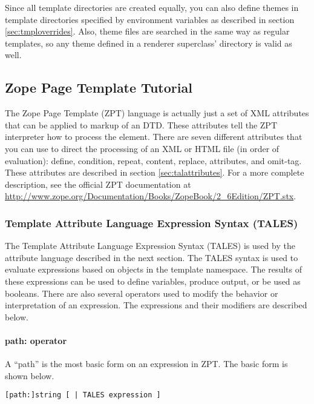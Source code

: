 Since all template directories are created equally, you can also define
themes in template directories specified by environment variables as
described in section \ref{sec:tmploverrides}.  Also, theme files are
searched in the same way as regular templates, so any theme defined
in a renderer superclass' directory is valid as well.


\subsection{Zope Page Template Tutorial\label{sec:zpttutorial}}

The Zope Page Template (ZPT) language is actually just a set of XML
attributes that can be applied to markup of an DTD.  These attributes
tell the ZPT interpreter how to process the element.  There are
seven different attributes that you can use to direct the processing
of an XML or HTML file (in order of evaluation): define, condition, repeat,
content, replace, attributes, and omit-tag.  These attributes are
described in section \ref{sec:talattributes}.  For a more complete description,
see the official ZPT documentation at
\url{http://www.zope.org/Documentation/Books/ZopeBook/2_6Edition/ZPT.stx}.


\subsubsection{Template Attribute Language Expression Syntax (TALES)}

The Template Attribute Language Expression Syntax (TALES) is used
by the attribute language described in the next section.  The TALES
syntax is used to evaluate expressions based on objects in the
template namespace.  The results of these expressions can be used to
define variables, produce output, or be used as booleans.  There are
also several operators used to modify the behavior or interpretation
of an expression.  The expressions and their modifiers are described
below.

\paragraph{path: operator\label{sec:pathoperator}}

A ``path'' is the most basic form on an expression in ZPT.  The basic form
is shown below.
\begin{verbatim}
[path:]string [ | TALES expression ]
\end{verbatim}

